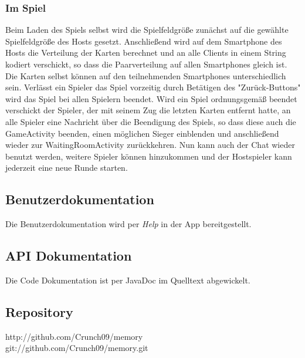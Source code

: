 \documentclass[11pt,a4paper]{article}
\begin{document}
\subsubsection{Im Spiel}
Beim Laden des Spiels selbst wird die Spielfeldgröße zunächst auf die gewählte Spielfeldgröße des Hosts gesetzt. Anschließend wird auf dem Smartphone des Hosts die Verteilung der Karten berechnet und an alle Clients in einem String kodiert verschickt, so dass die Paarverteilung auf allen Smartphones gleich ist. Die Karten selbst können auf den teilnehmenden Smartphones unterschiedlich sein. Verlässt ein Spieler das Spiel vorzeitig durch Betätigen des "Zurück-Buttons" wird das Spiel bei allen Spielern beendet. Wird ein Spiel ordnungsgemäß beendet verschickt der Spieler, der mit seinem Zug die letzten Karten entfernt hatte, an alle Spieler eine Nachricht über die Beendigung des Spiels, so dass diese auch die GameActivity beenden, einen möglichen Sieger einblenden und anschließend wieder zur WaitingRoomActivity zurückkehren.
Nun kann auch der Chat wieder benutzt werden, weitere Spieler können hinzukommen und der Hostspieler kann jederzeit eine neue Runde starten.
\subsection*{Benutzerdokumentation}

Die Benutzerdokumentation wird per {\em Help} in der App bereitgestellt. 

\subsection*{API Dokumentation}

Die Code Dokumentation ist per JavaDoc im Quelltext abgewickelt.

\subsection*{Repository}

http://github.com/Crunch09/memory \\
git://github.com/Crunch09/memory.git
\end{document}

